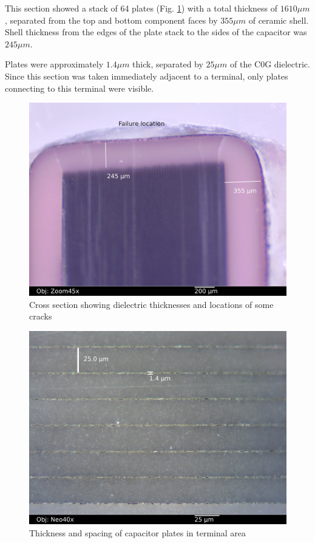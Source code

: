 \documentclass{article}
\begin{document}
This section showed a stack of 64 plates (Fig. \ref{section-plates}) with a total thickness of $1610 \mu m$, separated
from the top and bottom component faces by $355 \mu m$ of ceramic shell. Shell thickness from the edges of the plate
stack to the sides of the capacitor was $245 \mu m$.

Plates were approximately $1.4 \mu m$ thick, separated by $25 \mu m$ of the C0G dielectric. Since this section was
taken immediately adjacent to a terminal, only plates connecting to this terminal were visible.

\begin{figure}[h]
\includegraphics[width=12cm,keepaspectratio]{06-section1-45x_annotated2.jpg}
\caption{Cross section showing dielectric thicknesses and locations of some cracks}
\label{section-plates}
\end{figure}

\begin{figure}[h]
\includegraphics[width=12cm,keepaspectratio]{section1_09_df_neo40x_annotated2.jpg}
\caption{Thickness and spacing of capacitor plates in terminal area}
\label{plate-dimensions}
\end{figure}
\end{document}
